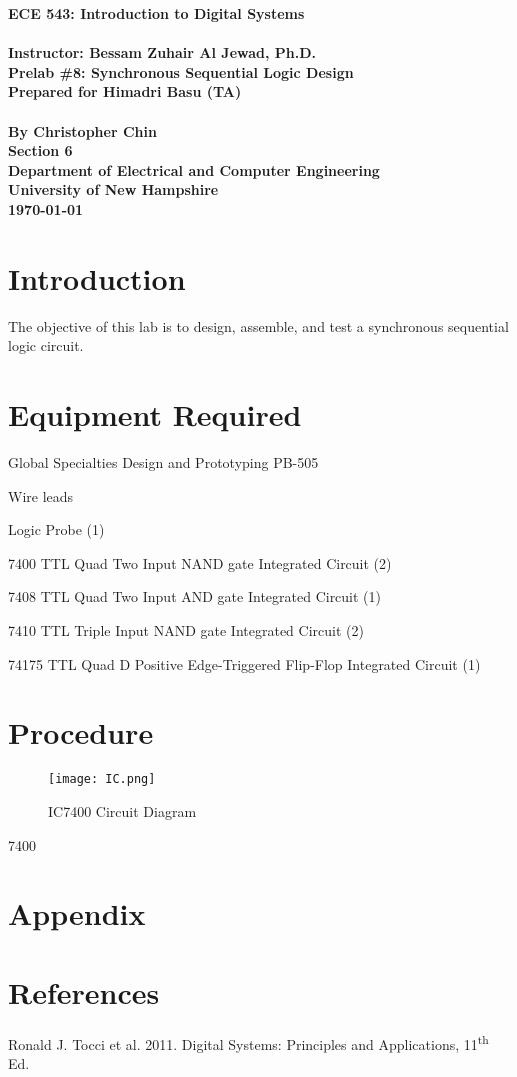 \documentclass[11pt,a4paper]{article}
\begin{document}
\begin{center}
\textbf{
    \Large{ECE 543: Introduction to Digital Systems}
    \\~\\
    \large{Instructor: Bessam Zuhair Al Jewad, Ph.D.}
    \\[1.25in]
    \LARGE{Prelab \#8: Synchronous Sequential Logic Design}
    \\[0.62in]
    \large{Prepared for Himadri Basu (TA)\\~\\By Christopher Chin}
    \\[1.25in]
    \LARGE{Section 6}
    \\[1.25in]
    \Large{Department of Electrical and Computer Engineering\\
           University of New Hampshire}
    \\[1.25in]
    \Large{\today}
}
\end{center}
\clearpage
{}

\tableofcontents
\pagebreak

\section{Introduction}
The objective of this lab is to design, assemble, and test a synchronous sequential logic circuit.
\section{Equipment Required}
    \item Global Specialties Design and Prototyping PB-505
    \item Wire leads
    \item Logic Probe (1)
    \item 7400 TTL Quad Two Input NAND gate Integrated Circuit (2)
    \item 7408 TTL Quad Two Input AND gate Integrated Circuit (1)
    \item 7410 TTL Triple Input NAND gate Integrated Circuit (2)
    \item 74175 TTL Quad D Positive Edge-Triggered Flip-Flop Integrated Circuit (1)
\section{Procedure}
\begin{figure}[h]
    \centering
    \texttt{[image: IC.png]}
    \caption{IC7400 Circuit Diagram}
\end{figure}7400
\section{Appendix}
\section{References}
Ronald J. Tocci et al. 2011. Digital Systems: Principles and Applications, 11\textsuperscript{th} Ed.
\end{document}
